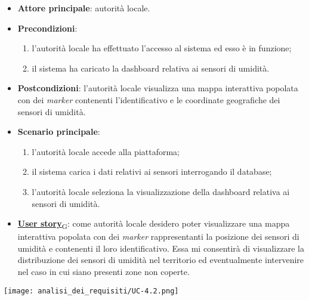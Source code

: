 \begin{itemize}
	\item \textbf{Attore principale}: autorità locale.
	\item \textbf{Precondizioni}:
	      \begin{enumerate}
		      \item l'autorità locale ha effettuato l'accesso al sistema ed esso è in funzione;
		      \item il sistema ha caricato la dashboard relativa ai sensori di umidità.
	      \end{enumerate}
	\item \textbf{Postcondizioni}: l'autorità locale visualizza una mappa interattiva popolata con dei \textit{marker} contenenti l'identificativo e le coordinate geografiche dei sensori di umidità.
	\item \textbf{Scenario principale}:
	      \begin{enumerate}
		      \item l'autorità locale accede alla piattaforma;
		      \item il sistema carica i dati relativi ai sensori interrogando il database;
		      \item l'autorità locale seleziona la visualizzazione della dashboard relativa ai sensori di umidità.
	      \end{enumerate}
	\item \href{https://7last.github.io/docs/rtb/documentazione-interna/glossario\#user-story}{\textbf{User story}\textsubscript{G}}:
	      come autorità locale desidero poter visualizzare una mappa interattiva popolata con dei \textit{marker} rappresentanti la posizione dei sensori di umidità
	      e contenenti il loro identificativo. Essa mi consentirà di visualizzare la distribuzione dei sensori di umidità nel territorio ed eventualmente intervenire nel caso in cui siano presenti zone non coperte.
\end{itemize}
\begin{center}
	\texttt{[image: analisi\_dei\_requisiti/UC-4.2.png]}
\end{center}


